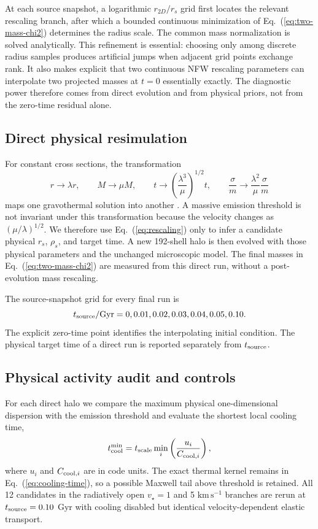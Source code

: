 \documentclass[12pt]{iopart}
\newcommand{\vstar}{v_\star}
\newcommand{\tcool}{t_{\rm cool}}
\begin{document}
At each source snapshot, a logarithmic $r_{2D}/r_s$ grid first locates the
relevant rescaling branch, after which a bounded continuous minimization of
Eq.~(\ref{eq:two-mass-chi2}) determines the radius scale.  The common mass
normalization is solved analytically.  This refinement is essential: choosing
only among discrete radius samples produces artificial jumps when adjacent
grid points exchange rank.  It also makes explicit that two continuous NFW
rescaling parameters can interpolate two projected masses at $t=0$ essentially
exactly.  The diagnostic power therefore comes from direct evolution and from
physical priors, not from the zero-time residual alone.

\subsection{Direct physical resimulation}

For constant cross sections, the transformation
\begin{equation}
 r\rightarrow\lambda r,\qquad M\rightarrow\mu M,\qquad
 t\rightarrow\left(\frac{\lambda^3}{\mu}\right)^{1/2}t,
 \qquad \frac{\sigma}{m}\rightarrow\frac{\lambda^2}{\mu}\frac{\sigma}{m}
 \label{eq:rescaling}
\end{equation}
maps one gravothermal solution into another \citep{Schmidt2026}.  A massive
emission threshold is not invariant under this transformation because the
velocity changes as $(\mu/\lambda)^{1/2}$.  We therefore use
Eq.~(\ref{eq:rescaling}) only to infer a candidate physical $r_s$, $\rho_s$,
and target time.  A new 192-shell halo is then evolved with those physical
parameters and the unchanged microscopic model.  The final masses in
Eq.~(\ref{eq:two-mass-chi2}) are measured from this direct run, without a
post-evolution mass rescaling.

The source-snapshot grid for every final run is
\begin{equation}
  t_{\rm source}/{\rm Gyr}=0,0.01,0.02,0.03,0.04,0.05,0.10.
  \label{eq:time-grid}
\end{equation}
The explicit zero-time point identifies the interpolating initial condition.
The physical target time of a direct run is reported separately from
$t_{\rm source}$.

\subsection{Physical activity audit and controls}

For each direct halo we compare the maximum physical one-dimensional
dispersion with the emission threshold and evaluate the shortest local
cooling time,
\begin{equation}
  \tcool^{\rm min}=t_{\rm scale}
  \min_i\left(\frac{u_i}{C_{{\rm cool},i}}\right),
  \label{eq:cooling-time}
\end{equation}
where $u_i$ and $C_{{\rm cool},i}$ are in code units.  The exact thermal
kernel remains in Eq.~(\ref{eq:cooling-time}), so a possible Maxwell tail
above threshold is retained.  All 12 candidates in the radiatively open
$\vstar=1$ and 5 $\mathrm{km\,s^{-1}}$ branches are rerun at
$t_{\rm source}=0.10$ Gyr with cooling disabled but identical
velocity-dependent elastic transport.
\end{document}
